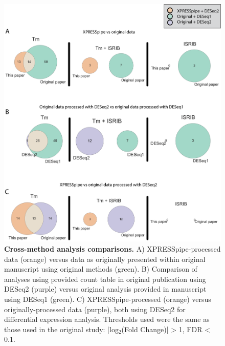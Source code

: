 \documentclass[10pt, oneside]{article}
\begin{document}
\begin{figure}
\centering
  \includegraphics[width=180mm]{figures/xpresspipe_supplement7.png}
  \caption{\textbf{Cross-method analysis comparisons.} A) XPRESSpipe-processed data (orange) versus data as originally presented within original manuscript using original methods (green). B) Comparison of analyses using provided count table in original publication using DESeq2 (purple) versus original analysis provided in manuscript using DESeq1 (green). C) XPRESSpipe-processed (orange) versus originally-processed data (purple), both using DESeq2 for differential expression analysis. Thresholds used were the same as those used in the original study: |log$_2$(Fold Change)| > 1, FDR < 0.1.}
  \label{fig:supplement7}
\end{figure}
\end{document}
